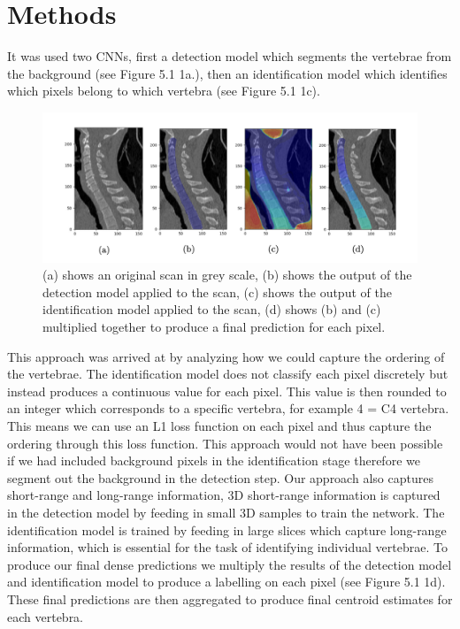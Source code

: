 \chapter{Methods}
\label{ch:methods}

It was used two CNNs, first a detection model which segments the vertebrae from the background (see Figure 5.1 1a.), then an identification model which identifies which pixels belong to which vertebra (see Figure 5.1 1c). 

\begin{figure}[!h]
\begin{center}
\includegraphics[width=.7\linewidth]{images/verteb_det_loc.png}
\caption {(a) shows an original scan in grey scale, (b) shows the output of the detection model applied to the scan, (c) shows the output of the identification model applied to the scan, (d) shows (b) and (c) multiplied together to produce a final prediction for each pixel.} 
\label{fig:verteb_det_loc}
\end{center}
\end{figure}

This approach was arrived at by analyzing how we could capture the ordering of the vertebrae. The identification model does not classify each pixel discretely but instead produces a continuous value for each pixel. This value is then rounded to an integer which corresponds to a specific vertebra, for example 4 = C4 vertebra. This means we can use an L1 loss function on each pixel and thus capture the ordering through this loss function. This approach would not have been possible if we had included background pixels in the identification stage therefore we segment out the background in the detection step. Our approach also captures short-range and long-range information, 3D short-range information is captured in the detection model by feeding in small 3D samples to train the network. The identification model is trained by feeding in large slices which capture long-range information, which is essential for the task of identifying individual vertebrae. To produce our final dense predictions we multiply the results of the detection model and identification model to produce a labelling on each pixel (see Figure 5.1 1d). These final predictions are then aggregated to produce final centroid estimates for each vertebra.


